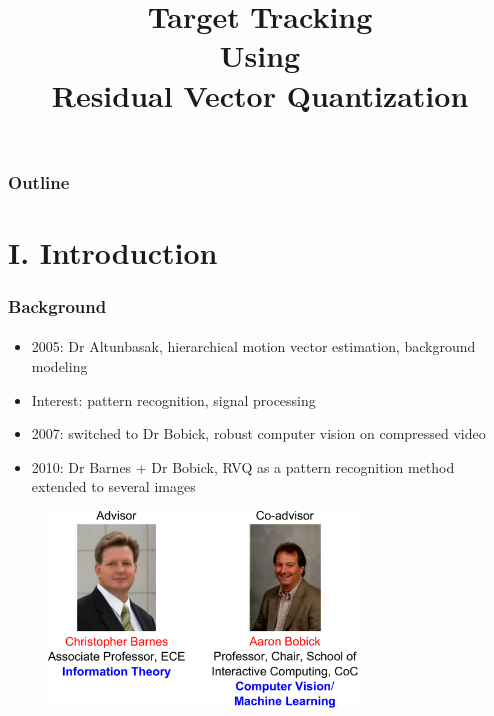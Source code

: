 

\title{Target Tracking \\ Using \\Residual Vector Quantization}
\begin{frame}[plain]\logoCSIPCPL\logoTechTower
	\titlepage
\end{frame}

\begin{frame}
\frametitle{Outline}
\logoCSIPCPL\logoTechTower
	\setcounter{tocdepth}{1}	
	\tableofcontents
\end{frame}

\section{I. Introduction}
\begin{frame}
\frametitle{Background}
\framesubtitle{}
\logoCSIPCPL\mypagenum
\vspace{0.2in}
\begin{itemize}
\item 2005: Dr Altunbasak, hierarchical motion vector estimation, background modeling
\item {\color{blue}Interest}: pattern recognition, signal processing
\item 2007: switched to Dr Bobick, robust computer vision on compressed video
\item 2010: Dr Barnes + Dr Bobick, RVQ as a pattern recognition method extended to several images
\end{itemize}
\begin{figure}
\includegraphics[width=0.73\textwidth]{thesis/professors.pdf}
\end{figure}
\end{frame}

